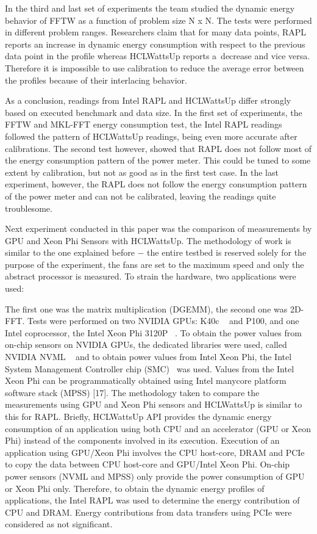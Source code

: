 In the third and last set of experiments the team studied the
dynamic energy behavior of FFTW as a function of problem size
N x N. The tests were performed in different problem ranges.
Researchers claim that for many data points, RAPL reports an
increase in dynamic energy consumption with respect to the
previous data point in the profile whereas HCLWattsUp reports
a~decrease and vice versa. Therefore it is impossible to use
calibration to reduce the average error between the profiles
because of their interlacing behavior.

As a conclusion, readings from Intel RAPL and HCLWattsUp differ
strongly based on executed benchmark and data size. In the first
set of experiments, the FFTW and MKL-FFT energy consumption test,
the Intel RAPL readings followed the pattern of HCLWattsUp
readings, being even more accurate after calibrations. The second
test however, showed that RAPL does not follow most of the energy
consumption pattern of the power meter. This could be tuned to
some extent by calibration, but not as good as in the first test
case. In the last experiment, however, the RAPL does not follow
the energy consumption pattern of the power meter and can not be
calibrated, leaving the readings quite troublesome.

Next experiment conducted in this paper was the comparison of
measurements by GPU and Xeon Phi Sensors with HCLWattsUp. The
methodology of work is similar to the one explained before $-$ the
entire testbed is reserved solely for the purpose of the
experiment, the fans are set to the maximum speed and only the
abstract processor is measured. To strain the hardware, two
applications were used:

The first one was the matrix multiplication (DGEMM), the second
one was 2D-FFT\@. Tests were performed on two NVIDIA GPUs: K40c
~\cite{Implementation_for_Accelerator_Kernels} and P100,
and one Intel coprocessor, the Intel Xeon Phi 3120P
~\cite{Intel_Xeon_Phi_Coprocessor_Architecture}.
To obtain the power values from on-chip sensors on NVIDIA GPUs,
the dedicated libraries were used, called NVIDIA NVML
~\cite{NVML_Reference_Manual} and
to obtain power values from Intel Xeon Phi, the Intel System
Management Controller chip
(SMC)~\cite{Intel_Xeon_Phi_Coprocessor_Developer} was used.
Values from the
Intel Xeon Phi can be programmatically obtained using Intel
manycore platform software stack (MPSS) [17]. The methodology
taken to compare the measurements using GPU and Xeon Phi sensors
and HCLWattsUp is similar to this for RAPL\@. Briefly, HCLWattsUp
API provides the dynamic energy consumption of an application
using both CPU and an accelerator (GPU or Xeon Phi) instead of
the components involved in its execution. Execution of an
application using GPU/Xeon Phi involves the CPU host-core, DRAM
and PCIe to copy the data between CPU host-core and GPU/Intel
Xeon Phi. On-chip power sensors (NVML and MPSS) only provide
the power consumption of GPU or Xeon Phi only. Therefore, to
obtain the dynamic energy profiles of applications, the Intel
RAPL was used to determine the energy contribution of CPU and
DRAM\@. Energy contributions from data transfers using PCIe were
considered as not significant.

